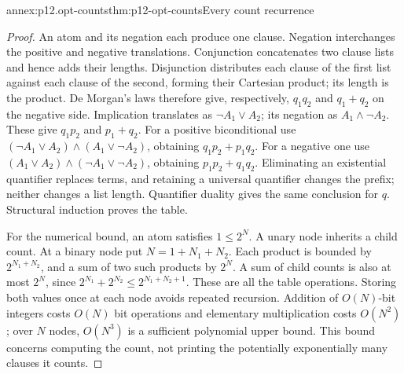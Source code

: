 \begin{annexitem}{annex:p12.opt-counts}{thm:p12-opt-counts}{Every count recurrence}
\begin{proof}
An atom and its negation each produce one clause. Negation
interchanges the positive and negative translations.
Conjunction concatenates two clause lists and hence adds their
lengths. Disjunction distributes each clause of the first list
against each clause of the second, forming their Cartesian product;
its length is the product. De Morgan's laws therefore give,
respectively, \(q_1q_2\) and \(q_1+q_2\) on the negative side.
Implication translates as \(\neg A_1\lor A_2\); its negation as
\(A_1\land\neg A_2\). These give \(q_1p_2\) and \(p_1+q_2\).
For a positive biconditional use
\((\neg A_1\lor A_2)\land(A_1\lor\neg A_2)\), obtaining
\(q_1p_2+p_1q_2\). For a negative one use
\((A_1\lor A_2)\land(\neg A_1\lor\neg A_2)\), obtaining
\(p_1p_2+q_1q_2\). Eliminating an existential quantifier replaces
terms, and retaining a universal quantifier changes the prefix;
neither changes a list length. Quantifier duality gives the same
conclusion for \(q\). Structural induction proves the table.

For the numerical bound, an atom satisfies \(1\le2^N\).
A unary node inherits a child count. At a binary node put
\(N=1+N_1+N_2\). Each product is bounded by
\(2^{N_1+N_2}\), and a sum of two such products by \(2^N\).
A sum of child counts is also at most \(2^N\), since
\(2^{N_1}+2^{N_2}\le2^{N_1+N_2+1}\).
These are all the table operations. Storing both values once at
each node avoids repeated recursion. Addition of \(O(N)\)-bit
integers costs \(O(N)\) bit operations and elementary multiplication
costs \(O(N^2)\); over \(N\) nodes, \(O(N^3)\) is a sufficient
polynomial upper bound. This bound concerns computing the count,
not printing the potentially exponentially many clauses it counts.
\end{proof}
\end{annexitem}

